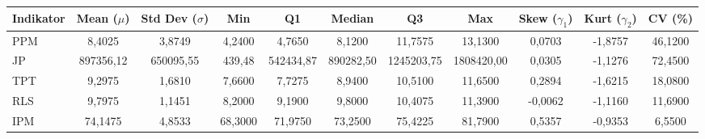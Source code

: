 \begin{adjustbox}{max width=\textwidth}
\small
\begin{tabular}{|>{\centering\arraybackslash}p{2.5cm}|c|c|c|c|c|c|c|c|c|c|}
\hline
\textbf{Indikator} & \textbf{Mean ($\mu$)} & \textbf{Std Dev ($\sigma$)} & \textbf{Min} & \textbf{Q1} & \textbf{Median} & \textbf{Q3} & \textbf{Max} & \textbf{Skew ($\gamma_1$)} & \textbf{Kurt ($\gamma_2$)} & \textbf{CV (\%)} \\
\hline
PPM & 8,4025 & 3,8749 & 4,2400 & 4,7650 & 8,1200 & 11,7575 & 13,1300 & 0,0703 & -1,8757 & 46,1200 \\
JP & 897356,12 & 650095,55 & 439,48 & 542434,87 & 890282,50 & 1245203,75 & 1808420,00 & 0,0305 & -1,1276 & 72,4500 \\
TPT & 9,2975 & 1,6810 & 7,6600 & 7,7275 & 8,9400 & 10,5100 & 11,6500 & 0,2894 & -1,6215 & 18,0800 \\
RLS & 9,7975 & 1,1451 & 8,2000 & 9,1900 & 9,8000 & 10,4075 & 11,3900 & -0,0062 & -1,1160 & 11,6900 \\
IPM & 74,1475 & 4,8533 & 68,3000 & 71,9750 & 73,2500 & 75,4225 & 81,7900 & 0,5357 & -0,9353 & 6,5500 \\
\hline
\end{tabular}
\end{adjustbox}
